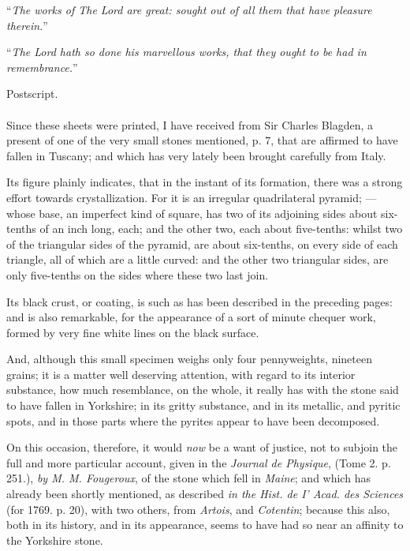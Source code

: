 \documentclass[a4paper, 12pt, oneside]{article}
\begin{document}
``\emph{The works of The Lord are great: sought out of all them that have pleasure therein.}''

``\emph{The Lord hath so done his marvellous works, that they ought to be had in remembrance.}''
\clearpage
\begin{center}
Postscript.
\end{center}
\paragraph{}
Since these sheets were printed, I have received from Sir Charles Blagden, a present of one of the very small stones mentioned, p. 7, that are affirmed to have fallen in Tuscany; and which has very lately been brought carefully from Italy.

Its figure plainly indicates, that in the instant of its formation, there was a strong effort towards crystallization. For it is an irregular quadrilateral pyramid; --- whose base, an imperfect kind of square, has two of its adjoining sides about six-tenths of an inch long, each; and the other two, each about five-tenths: whilst two of the triangular sides of the pyramid, are about six-tenths, on every side of each triangle, all of which are a little curved: and the other two triangular sides, are only five-tenths on the sides where these two last join.

Its black crust, or coating, is such as has been described in the preceding pages: and is also remarkable, for the appearance of a sort of minute chequer work, formed by very fine white lines on the black surface.

And, although this small specimen weighs only four pennyweights, nineteen grains; it is a matter well deserving attention, with regard to its interior substance, how much resemblance, on the whole, it really has with the stone said to have fallen in Yorkshire; in its gritty substance, and in its metallic, and pyritic spots, and in those parts where the pyrites appear to have been decomposed.

On this occasion, therefore, it would \emph{now} be a want of justice, not to subjoin the full and more particular account, given in the \emph{Journal de Physique}, (Tome 2. p. 251.), \emph{by M. M. Fougeroux}, of the stone which fell in \emph{Maine}; and which has already been shortly mentioned, as described \emph{in the Hist. de I' Acad. des Sciences} (for 1769. p. 20), with two others, from \emph{Artois}, and \emph{Cotentin}; because this also, both in its history, and in its appearance, seems to have had so near an affinity to the Yorkshire stone.
\end{document}
